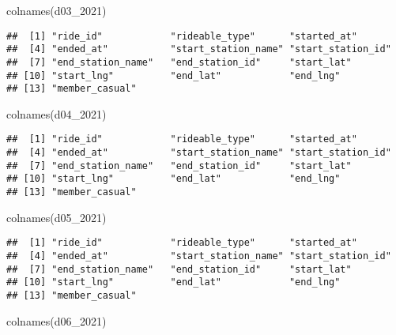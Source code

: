 \documentclass[
]{article}
\newenvironment{Shaded}{\begin{snugshade}}{\end{snugshade}}
\newcommand{\FunctionTok}[1]{\textcolor[rgb]{0.00,0.00,0.00}{#1}}
\newcommand{\NormalTok}[1]{#1}
\begin{document}
\begin{Shaded}
\begin{Highlighting}[]
\FunctionTok{colnames}\NormalTok{(d03\_2021)}
\end{Highlighting}
\end{Shaded}

\begin{verbatim}
##  [1] "ride_id"            "rideable_type"      "started_at"        
##  [4] "ended_at"           "start_station_name" "start_station_id"  
##  [7] "end_station_name"   "end_station_id"     "start_lat"         
## [10] "start_lng"          "end_lat"            "end_lng"           
## [13] "member_casual"
\end{verbatim}

\begin{Shaded}
\begin{Highlighting}[]
\FunctionTok{colnames}\NormalTok{(d04\_2021)}
\end{Highlighting}
\end{Shaded}

\begin{verbatim}
##  [1] "ride_id"            "rideable_type"      "started_at"        
##  [4] "ended_at"           "start_station_name" "start_station_id"  
##  [7] "end_station_name"   "end_station_id"     "start_lat"         
## [10] "start_lng"          "end_lat"            "end_lng"           
## [13] "member_casual"
\end{verbatim}

\begin{Shaded}
\begin{Highlighting}[]
\FunctionTok{colnames}\NormalTok{(d05\_2021)}
\end{Highlighting}
\end{Shaded}

\begin{verbatim}
##  [1] "ride_id"            "rideable_type"      "started_at"        
##  [4] "ended_at"           "start_station_name" "start_station_id"  
##  [7] "end_station_name"   "end_station_id"     "start_lat"         
## [10] "start_lng"          "end_lat"            "end_lng"           
## [13] "member_casual"
\end{verbatim}

\begin{Shaded}
\begin{Highlighting}[]
\FunctionTok{colnames}\NormalTok{(d06\_2021)}
\end{Highlighting}
\end{Shaded}
\end{document}
